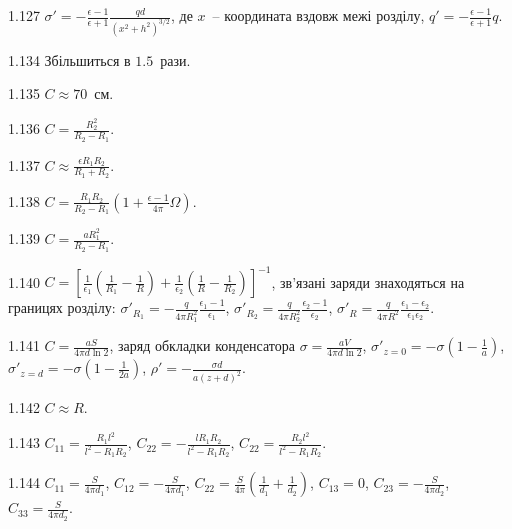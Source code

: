 \begin{Solution}{1.{127}}
	$\sigma' = - \frac{\epsilon - 1}{\epsilon + 1} \frac{qd}{(x^2  +h^2)^{3/2}}$, де $x$~-- координата вздовж межі розділу, $q' = - \frac{\epsilon - 1}{\epsilon + 1}q$.
\end{Solution}
\begin{Solution}{1.{134}}
	Збільшиться в $1.5$~рази.
\end{Solution}
\begin{Solution}{1.{135}}
	$C \approx 70$~см.
\end{Solution}
\begin{Solution}{1.{136}}
	$C = \frac{R_2^2}{R_2 - R_1}$.
\end{Solution}
\begin{Solution}{1.{137}}
	$C \approx \frac{\epsilon R_1R_2}{R_1 + R_2}$.
\end{Solution}
\begin{Solution}{1.{138}}
	$C =\frac{R_1R_2}{R_2 - R_1} \left( 1 + \frac{\epsilon - 1}{4\pi}\Omega\right) $.
\end{Solution}
\begin{Solution}{1.{139}}
	$C = \frac{aR_1^2}{R_2 - R_1}$.
\end{Solution}
\begin{Solution}{1.{140}}
	$C = \left[ \frac{1}{\epsilon_1}\left( \frac{1}{R_1} - \frac{1}{R}\right) + \frac{1}{\epsilon_2}\left( \frac{1}{R} - \frac{1}{R_2}\right) \right]^{-1} $, зв'язані заряди знаходяться на границях розділу: $\sigma'_{R_1} = - \frac{q}{4\pi R_1^2}\frac{\epsilon_1 - 1}{\epsilon_1}$, $\sigma'_{R_2} =  \frac{q}{4\pi R_2^2}\frac{\epsilon_2 - 1}{\epsilon_2}$, $\sigma'_{R} = \frac{q}{4\pi R^2}\frac{\epsilon_1 - \epsilon_2}{\epsilon_1\epsilon_2}$.
\end{Solution}
\begin{Solution}{1.{141}}
	$C = \frac{aS}{4\pi d\ln2}$, заряд обкладки конденсатора $\sigma = \frac{aV}{4\pi d\ln2}$, $\sigma'_{z=0} = -\sigma \left( 1 - \frac{1}{a} \right) $, $\sigma'_{z=d} = -\sigma \left( 1 - \frac{1}{2a} \right) $, $\rho' = -\frac{\sigma d}{a(z + d)^2}$.
\end{Solution}
\begin{Solution}{1.{142}}
	$C \approx R$.
\end{Solution}
\begin{Solution}{1.{143}}
	$C_{11} = \frac{R_1 l^2}{l^2 - R_1R_2}$, $C_{22}  = -\frac{lR_1R_2}{l^2 - R_1R_2}$, $C_{22} = \frac{R_2 l^2}{l^2 - R_1R_2}$.
\end{Solution}
\begin{Solution}{1.{144}}
	$C_{11} = \frac{S}{4\pi d_1}$, $C_{12} = -\frac{S}{4\pi d_1}$, $C_{22} = \frac{S}{4\pi}\left( \frac{1}{d_1} + \frac{1}{d_2} \right) $, $C_{13} = 0$, $C_{23} = -\frac{S}{4\pi d_2}$, $C_{33} = \frac{S}{4\pi d_2}$.
\end{Solution}
